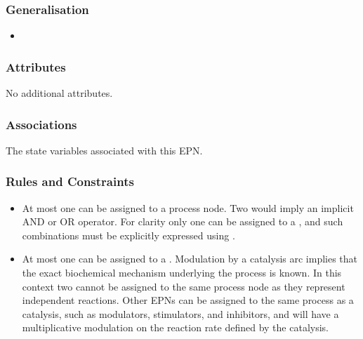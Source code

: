 \subsubsection{Generalisation}

\begin{itemize}
\item {}
\end{itemize}

\subsubsection{Attributes}

No additional attributes.

\subsubsection{Associations}

\begin{attributes}
 The state variables
  associated with this EPN.
\end{attributes}

\subsubsection{Rules and Constraints}

\begin{itemize}
\item At most one  can be assigned to a process node. Two 
  would imply an implicit AND or OR operator. For clarity only
  one  can be assigned to a , and such combinations must be
  explicitly expressed using . 
\item At most one  can be assigned to a
  . Modulation by a catalysis arc implies that the exact biochemical mechanism underlying
  the process is known. In this context two  cannot
  be assigned to the same process node as they represent
  independent reactions. Other EPNs can be assigned to the same process as a catalysis, such as modulators, stimulators, and
  inhibitors, and will have a multiplicative modulation on the
  reaction rate defined by the catalysis.
\end{itemize}

